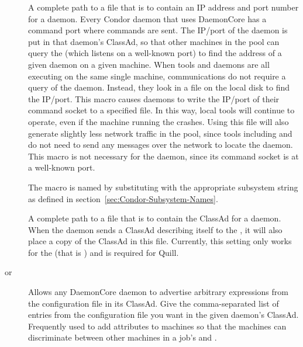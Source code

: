 \begin{description}
\item[]
  \label{param:SubsysAddressFile}
  A complete path to a file that is to contain an
  IP address and port number for a daemon. 
  Every Condor daemon that uses
  DaemonCore has a command port where commands are sent.
  The IP/port of the daemon is put in that daemon's ClassAd,
  so that other machines in the pool can query the
   (which listens on a well-known port)
  to find the address of a given daemon on a given machine.
  When tools and daemons are all executing on the same
  single machine, communications do not require a query of the
   daemon.
  Instead, they look in a file on the local disk
  to find the IP/port.
  This macro causes daemons to write the
  IP/port of their command socket to a specified file.
  In this way,
  local tools will continue to operate,
  even if the machine running the  crashes.
  Using this file will also generate
  slightly less network traffic in the pool,
  since tools including  and
   do not need to send any messages over the network to
  locate the  daemon.
  This macro is not necessary for the  
  daemon, since its command socket is at a well-known port.  
  
  The macro is named by substituting 
  with the appropriate subsystem string as defined in
  section~\ref{sec:Condor-Subsystem-Names}.
  
\item[]
  \label{param:SubsysDaemonAdFile}
  A complete path to a file that is to contain the ClassAd for a daemon.
  When the daemon sends a ClassAd describing itself to the
  , it will also place a copy of the ClassAd in this
  file. Currently, this setting only works for the 
  (that is ) and is required for Quill.

\item[ or \label{param:SubsysExprs}
  ] \label{param:SubsysAttrs}
  Allows any DaemonCore daemon to advertise arbitrary
  expressions from the configuration file in its ClassAd.  Give the
  comma-separated list of entries from the configuration file you want in the
  given daemon's ClassAd.
  Frequently used to add attributes to machines so that the
  machines can discriminate between other machines in a job's 
   and .


\end{description}

